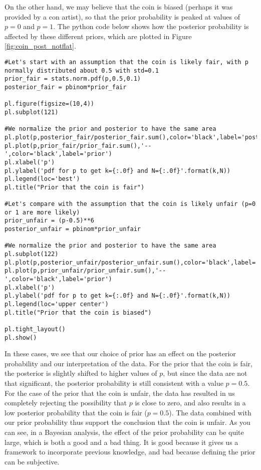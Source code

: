 On the other hand, we may believe that the coin is biased (perhaps it was provided by a con artist), so that the prior probability is peaked at values of $p=0$ and $p=1$. The python code below shows how the posterior probability is affected by these different priors, which are plotted in Figure \ref{fig:coin_post_notflat}.
\begin{lstlisting}[frame=single] 
#Let's start with an assumption that the coin is likely fair, with p normally distributed about 0.5 with std=0.1
prior_fair = stats.norm.pdf(p,0.5,0.1)
posterior_fair = pbinom*prior_fair

pl.figure(figsize=(10,4))
pl.subplot(121)

#We normalize the prior and posterior to have the same area
pl.plot(p,posterior_fair/posterior_fair.sum(),color='black',label='posterior')
pl.plot(p,prior_fair/prior_fair.sum(),'--',color='black',label='prior')
pl.xlabel('p')
pl.ylabel('pdf for p to get k={:.0f} and N={:.0f}'.format(k,N))
pl.legend(loc='best')
pl.title("Prior that the coin is fair")

#Let's compare with the assumption that the coin is likely unfair (p=0 or 1 are more likely)
prior_unfair = (p-0.5)**6
posterior_unfair = pbinom*prior_unfair

#We normalize the prior and posterior to have the same area
pl.subplot(122)
pl.plot(p,posterior_unfair/posterior_unfair.sum(),color='black',label='posterior')
pl.plot(p,prior_unfair/prior_unfair.sum(),'--',color='black',label='prior')
pl.xlabel('p')
pl.ylabel('pdf for p to get k={:.0f} and N={:.0f}'.format(k,N))
pl.legend(loc='upper center')
pl.title("Prior that the coin is biased")

pl.tight_layout()
pl.show()
\end{lstlisting}

In these cases, we see that our choice of prior has an effect on the posterior probability and our interpretation of the data. For the prior that the coin is fair, the posterior is slightly shifted to higher values of $p$, but since the data are not that significant, the posterior probability is still consistent with a value $p=0.5$. For the case of the prior that the coin is unfair, the data has resulted in us completely rejecting the possibility that $p$ is close to zero, and also results in a low posterior probability that the coin is fair ($p=0.5$). The data combined with our prior probability thus support the conclusion that the coin is unfair. As you can see, in a Bayesian analysis, the effect of the prior probability can be quite large, which is both a good and a bad thing. It is good because it gives us a framework to incorporate previous knowledge, and bad because defining the prior can be subjective.

